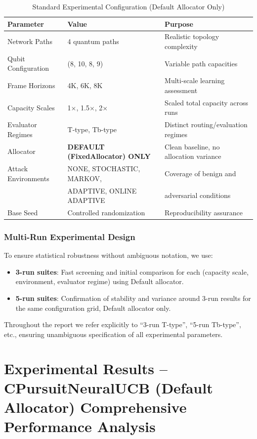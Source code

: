 \documentclass[12pt,a4paper]{article}
\newcommand{\critical}[1]{\textcolor{criticalcolor}{\textbf{#1}}}
\begin{document}
\begin{table}[H]
\centering
\caption{Standard Experimental Configuration (Default Allocator Only)}
\begin{tabular}{|l|l|l|}
\hline
\textbf{Parameter} & \textbf{Value} & \textbf{Purpose} \\
\hline
Network Paths & 4 quantum paths & Realistic topology complexity \\
Qubit Configuration & (8, 10, 8, 9) & Variable path capacities \\
Frame Horizons & 4K, 6K, 8K & Multi-scale learning assessment \\
Capacity Scales & 1$\times$, 1.5$\times$, 2$\times$ & Scaled total capacity across runs \\
Evaluator Regimes & T-type, Tb-type & Distinct routing/evaluation regimes \\
Allocator & \critical{DEFAULT (FixedAllocator) ONLY} & Clean baseline, no allocation variance \\
Attack Environments & NONE, STOCHASTIC, MARKOV, & Coverage of benign and \\
 & ADAPTIVE, ONLINE ADAPTIVE & adversarial conditions \\
Base Seed & Controlled randomization & Reproducibility assurance \\
\hline
\end{tabular}
\end{table}

\subsubsection{Multi-Run Experimental Design}

To ensure statistical robustness without ambiguous notation, we use:

\begin{itemize}
\item \textbf{3-run suites}: Fast screening and initial comparison for each (capacity scale, environment, evaluator regime) using Default allocator.
\item \textbf{5-run suites}: Confirmation of stability and variance around 3-run results for the same configuration grid, Default allocator only.
\end{itemize}

Throughout the report we refer explicitly to ``3-run T-type'', ``5-run Tb-type'', etc., ensuring unambiguous specification of all experimental parameters.

\newpage
\section{Experimental Results – CPursuitNeuralUCB (Default Allocator) Comprehensive Performance Analysis}
\end{document}
